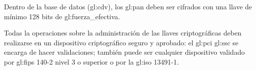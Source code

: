 {
  Dentro de la base de datos (\gls{gl:cdv}), los \gls{gl:pan} deben ser
  cifrados con una llave de mínimo 128 bits de \gls{gl:fuerza_efectiva}.
}

{
  Todas la operaciones sobre la administración de las llaves criptográficas
  deben realizarse en un dispositivo criptográfico seguro y aprobado: el
  \gls{gl:pci} \gls{gl:ssc} se encarga de hacer validaciones; también puede ser
  cualquier dispositivo validado por \gls{gl:fips} 140-2 nivel 3 o superior
  \cite{nist_modulos_criptograficos} o por la \gls{gl:iso} 13491-1.
}
